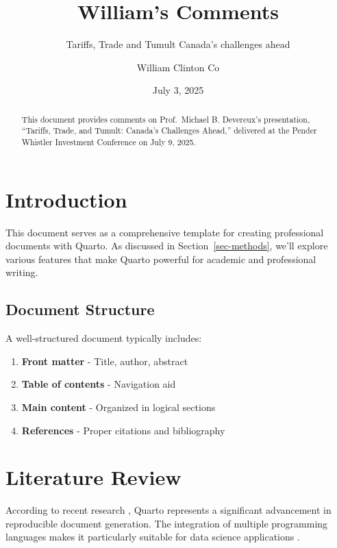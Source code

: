 \documentclass[
  11pt,
]{article}
\title{William's Comments}
\subtitle{Tariffs, Trade and Tumult Canada's challenges ahead}
\author{William Clinton Co}
\date{July 3, 2025}
\providecommand{\tightlist}{%
  \setlength{\itemsep}{0pt}\setlength{\parskip}{0pt}}
\renewcommand*\contentsname{Table of contents}
\newcommand\contentsname{Table of contents}
\begin{document}
\maketitle
\begin{abstract}
This document provides comments on Prof.~Michael B. Devereux's
presentation, ``Tariffs, Trade, and Tumult: Canada's Challenges Ahead,''
delivered at the Pender Whistler Investment Conference on July 9, 2025.
\end{abstract}

\renewcommand*\contentsname{Table of contents}
{
\hypersetup{linkcolor=}
\setcounter{tocdepth}{3}
\tableofcontents
}
\listoffigures
\listoftables

\section{Introduction}\label{sec-introduction}

This document serves as a comprehensive template for creating
professional documents with Quarto. As discussed in
Section~\ref{sec-methods}, we'll explore various features that make
Quarto powerful for academic and professional writing.

\subsection{Document Structure}\label{document-structure}

A well-structured document typically includes:

\begin{enumerate}
\def\labelenumi{\arabic{enumi}.}
\tightlist
\item
  \textbf{Front matter} - Title, author, abstract
\item
  \textbf{Table of contents} - Navigation aid
\item
  \textbf{Main content} - Organized in logical sections
\item
  \textbf{References} - Proper citations and bibliography
\end{enumerate}

\section{Literature Review}\label{sec-literature}

According to recent research \autocite{doe2023}, Quarto represents a
significant advancement in reproducible document generation. The
integration of multiple programming languages makes it particularly
suitable for data science applications \autocite{smith2023}.
\end{document}
